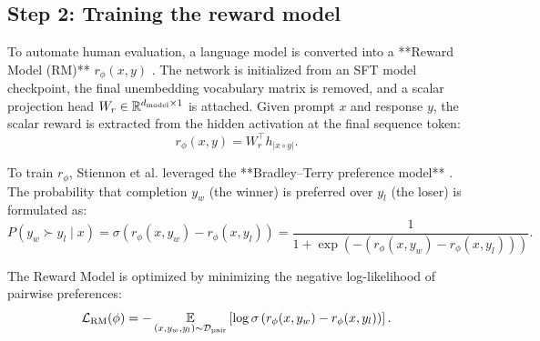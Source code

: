 \documentclass[../../../main.tex]{subfiles}
\begin{document}
\subsection{Step 2: Training the reward model}
\label{subsec:step2_training_reward_model}

To automate human evaluation, a language model is converted into a **Reward Model (RM)** $r_\phi(x, y)$ \citep{xiao2025}. The network is initialized from an SFT model checkpoint, the final unembedding vocabulary matrix is removed, and a scalar projection head $W_r \in \mathbb{R}^{d_{\text{model}} \times 1}$ is attached. Given prompt $x$ and response $y$, the scalar reward is extracted from the hidden activation at the final sequence token:
\begin{equation}
r_\phi(x, y) = W_r^\top h_{|x \circ y|}.
\end{equation}

To train $r_\phi$, Stiennon et al. leveraged the **Bradley--Terry preference model** \citep{bradley1952}. The probability that completion $y_w$ (the winner) is preferred over $y_l$ (the loser) is formulated as:
\begin{equation}
\label{eq:bradley_terry_probability_formula}
P(y_w \succ y_l \mid x) = \sigma\left(r_\phi(x, y_w) - r_\phi(x, y_l)\right) = \frac{1}{1 + \exp\left(-\left(r_\phi(x, y_w) - r_\phi(x, y_l)\right)\right)}.
\end{equation}

The Reward Model is optimized by minimizing the negative log-likelihood of pairwise preferences:
\begin{equation}
\label{eq:rm_ranking_loss_explicit}
\mathcal{L}_{\text{RM}}(\phi) = -\operatorname*{\mathbb{E}}_{(x, y_w, y_l) \sim \mathcal{D}_{\text{pair}}} \left[ \log \sigma\left( r_\phi(x, y_w) - r_\phi(x, y_l) \right) \right].
\end{equation}
\end{document}
